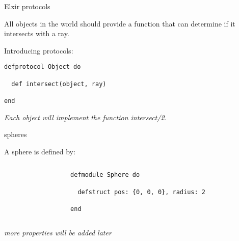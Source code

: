 \begin{frame}[fragile]{Elxir protocols}

  All objects in the world should provide a function that can
  determine if it intersects with a ray.

  \pause

  Introducing protocols:
  
\begin{verbatim}
defprotocol Object do

  def intersect(object, ray)

end
\end{verbatim}

\pause\vspace{20pt}

{\em  Each object will implement the function intersect/2.}
  
\end{frame}



\begin{frame}[fragile]{spheres}

A sphere is defined by:
\vspace{20pt}\pause

\begin{columns}[T]
 \begin{column}{0.3\linewidth}

 \end{column}
\pause
 \begin{column}{0.7\linewidth}
\begin{verbatim}
defmodule Sphere do

  defstruct pos: {0, 0, 0}, radius: 2

end
\end{verbatim}

 \end{column}
\end{columns}

\vspace{20pt}\pause
{\em more properties will be added later}
\end{frame}

